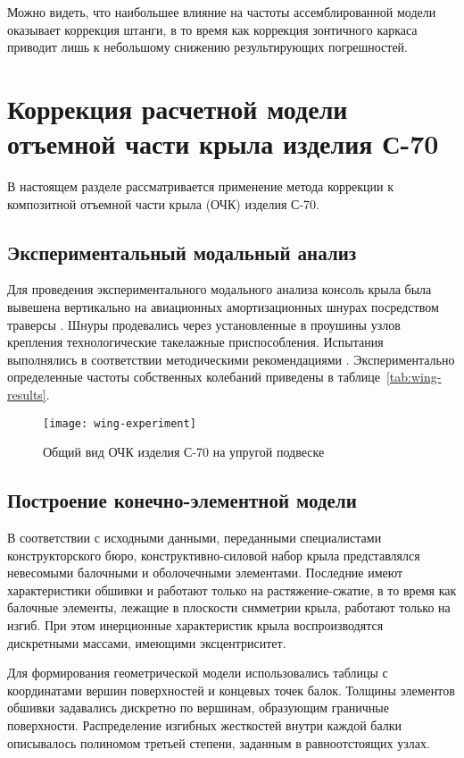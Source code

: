 Можно видеть, что наибольшее влияние на частоты ассемблированной модели оказывает коррекция штанги, в то время как коррекция зонтичного каркаса приводит лишь к небольшому снижению результирующих погрешностей.

\section{Коррекция расчетной модели отъемной части крыла изделия \mbox{С-70}}

В настоящем разделе рассматривается применение метода коррекции к композитной отъемной части крыла (ОЧК) изделия \mbox{С-70}. 

\subsection{Экспериментальный модальный анализ}

Для проведения экспериментального модального анализа консоль крыла была вывешена вертикально на авиационных амортизационных шнурах посредством траверсы . Шнуры продевались через установленные в проушины узлов крепления технологические такелажные приспособления. Испытания выполнялись в соответствии методическими рекомендациями \cite{lib:aprobation:Moskalik}. Экспериментально определенные частоты собственных колебаний приведены в таблице~\ref{tab:wing-results}.

\begin{figure}[H]
	\centerfloat
	\texttt{[image: wing-experiment]}
	\caption{Общий вид ОЧК изделия \mbox{С-70} на упругой подвеске} \label{fig:wing-experiment}
\end{figure}

\subsection{Построение конечно-элементной модели}

В соответствии с исходными данными, переданными специалистами конструкторского бюро, конструктивно-силовой набор крыла представлялся невесомыми балочными и оболочечными элементами. Последние имеют характеристики обшивки и работают только на растяжение-сжатие, в то время как балочные элементы, лежащие в плоскости симметрии крыла, работают только на изгиб. При этом инерционные характеристик крыла воспроизводятся дискретными массами, имеющими эксцентриситет.

Для формирования геометрической модели использовались таблицы с координатами вершин поверхностей и концевых точек балок. Толщины элементов обшивки задавались дискретно по вершинам, образующим граничные поверхности. Распределение изгибных жесткостей внутри каждой балки описывалось полиномом третьей степени, заданным в равноотстоящих узлах. 

